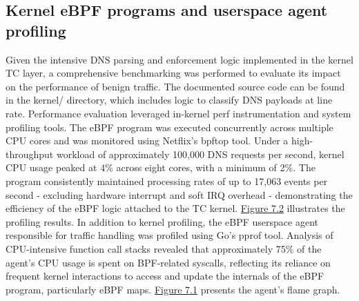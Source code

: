 \documentclass [11pt, proquest] {uwthesis}[2020/02/24]
\begin{document}
\subsection{Kernel eBPF programs and userspace agent profiling}
Given the intensive DNS parsing and enforcement logic implemented in the kernel TC layer, a comprehensive benchmarking was performed to evaluate its impact on the performance of benign traffic. The documented source code can be found in the kernel/ directory, which includes logic to classify DNS payloads at line rate. Performance evaluation leveraged in-kernel perf instrumentation and system profiling tools.
The eBPF program was executed concurrently across multiple CPU cores and was monitored using Netflix’s bpftop tool. Under a high-throughput workload of approximately 100,000 DNS requests per second, kernel CPU usage peaked at 4\% across eight cores, with a minimum of 2\%. The program consistently maintained processing rates of up to 17,063 events per second - excluding hardware interrupt and soft IRQ overhead - demonstrating the efficiency of the eBPF logic attached to the TC kernel. \hyperref[fig:c3]{Figure 7.2} illustrates the profiling results.
In addition to kernel profiling, the eBPF userspace agent responsible for traffic handling was profiled using Go's pprof tool. Analysis of CPU-intensive function call stacks revealed that approximately 75\% of the agent’s CPU usage is spent on BPF-related syscalls, reflecting its reliance on frequent kernel interactions to access and update the internals of the eBPF program, particularly eBPF maps. \hyperref[fig:c4]{Figure 7.1} presents the agent’s flame graph.



\end{document}

